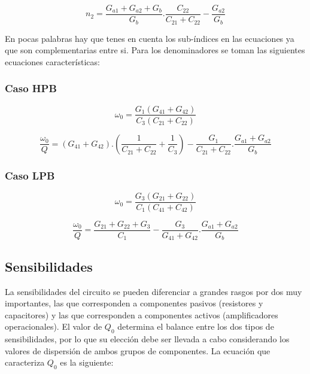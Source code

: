 \begin{equation}
	n_2 = \frac{G_{a1}+G_{a2}+G_b}{G_b} . \frac{C_{22}}{C_{21} + C_{22}} - \frac{G_{a2}}{G_b}
	\label{coef n2 LPB}
\end{equation}

En pocas palabras hay que tenes en cuenta los sub-índices en las ecuaciones ya que son complementarias entre si. Para los  denominadores se toman las siguientes ecuaciones características:

\subsubsection*{Caso HPB}

\begin{equation}
\omega_0 = \frac{G_1 ( G_{41} + G_{42} )}{C_3 ( C_{21} + C_{22} ) }
\label{w0 HPB}
\end{equation}

\begin{equation}
\frac{\omega_0}{Q} = (G_{41}+G_{42}). \left( \frac{1}{C_{21} + C_{22}} + \frac{1}{C_3} \right) - \frac{G_1}{C_{21} + C_{22}} . \frac{G_{a1}+G_{a2}}{G_b}
\label{w/Q HPB}
\end{equation}

\subsubsection*{Caso LPB}

\begin{equation}
\omega_0 = \frac{G_3 ( G_{21} + G_{22} )}{C_1 ( C_{41} + C_{42} ) }
\label{w0 LPB}
\end{equation}

\begin{equation}
\frac{\omega_0}{Q} = \frac{G_{21} + G_{22} + G_3}{C_1} - \frac{G_3}{G_{41}+G_{42}} . \frac{G_{a1}+G_{a2}}{G_b}
\label{w/Q LPB}
\end{equation}

\subsection{Sensibilidades}

La sensibilidades del circuito se pueden diferenciar a grandes rasgos por dos muy importantes, las que corresponden a componentes pasivos (resistores y capacitores) y las que corresponden a componentes activos (amplificadores operacionales). El valor de $Q_0$ determina el balance entre los dos tipos de sensibilidades, por lo que su elección debe ser llevada a cabo considerando los valores de dispersión de ambos grupos de componentes. La ecuación que caracteriza $Q_0$ es la siguiente:

